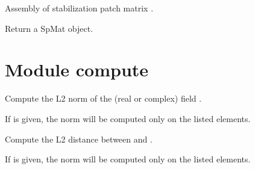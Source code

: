 \documentclass[a4paper,11pt,english]{sphinxmanual}
\begin{document}

\begin{fulllineitems}
\label{\detokenize{python/cmdref_Module asm:getfem.asm_stabilization_patch_matrix}}
Assembly of stabilization patch matrix .

Return a SpMat object.

\end{fulllineitems}



\section{Module compute}
\label{\detokenize{python/cmdref_Module compute:module-compute}}\label{\detokenize{python/cmdref_Module compute::doc}}

\begin{fulllineitems}
\label{\detokenize{python/cmdref_Module compute:getfem.compute_L2_norm}}
Compute the L2 norm of the (real or complex) field .

If  is given, the norm will be computed only on the listed
elements.

\end{fulllineitems}


\begin{fulllineitems}
\label{\detokenize{python/cmdref_Module compute:getfem.compute_L2_dist}}
Compute the L2 distance between  and .

If  is given, the norm will be computed only on the listed
elements.

\end{fulllineitems}
\end{document}
